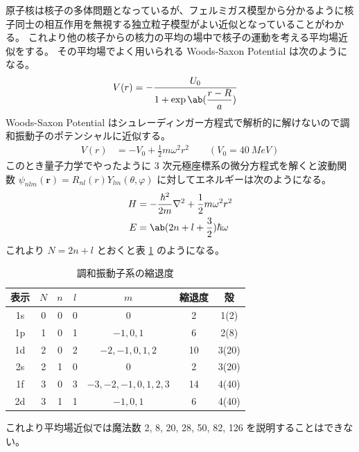 \documentclass[uplatex,dvipdfmx,a4paper,11pt]{jlreq}
\newcommand{\rr}{\bm{r}}
\numberwithin{equation}{section}
\theoremstyle{definition}
\begin{document}
原子核は核子の多体問題となっているが、フェルミガス模型から分かるように核子同士の相互作用を無視する独立粒子模型がよい近似となっていることがわかる。
これより他の核子からの核力の平均の場中で核子の運動を考える平均場近似をする。
その平均場でよく用いられる Woods-Saxon Potential は次のようになる。
\begin{align}
  V(r) & = -\frac{U_0}{1 + \exp\ab(\dfrac{r - R}{a})}
\end{align}
Woods-Saxon Potential はシュレーディンガー方程式で解析的に解けないので調和振動子のポテンシャルに近似する。
\begin{align}
  V(r) & = -V_0 + \frac{1}{2}m\omega^2r^2 \qquad (V_0 = 40\ \si{MeV})
\end{align}
このとき量子力学でやったように 3 次元極座標系の微分方程式を解くと波動関数 $\psi_{nlm}(\rr) = R_{nl}(r)Y_{lm}(\theta, \varphi)$ に対してエネルギーは次のようになる。
\begin{align}
  H & = -\frac{\hbar^2}{2m}\nabla^2 + \frac{1}{2}m\omega^2r^2 \\
  E & = \ab(2n + l + \frac{3}{2})\hbar\omega
\end{align}
これより $N = 2n + l$ とおくと表 \ref{table:oscillator} のようになる。
\begin{table}[hbtp]
  \centering
  \begin{tabular}{|c|c|c|c|c|c|c|}
    \hline
    表示 & $N$ & $n$ & $l$ & $m$                & 縮退度 & 殻     \\
    \hline \hline
    1s & 0   & 0   & 0   & 0                  & 2   & 1(2)  \\
    1p & 1   & 0   & 1   & $-1,0,1$           & 6   & 2(8)  \\
    1d & 2   & 0   & 2   & $-2,-1,0,1,2$      & 10  & 3(20) \\
    2s & 2   & 1   & 0   & 0                  & 2   & 3(20) \\
    1f & 3   & 0   & 3   & $-3,-2,-1,0,1,2,3$ & 14  & 4(40) \\
    2d & 3   & 1   & 1   & $-1,0,1$           & 6   & 4(40) \\
    \hline
  \end{tabular}
  \caption{調和振動子系の縮退度}
  \label{table:oscillator}
\end{table}
これより平均場近似では魔法数 2, 8, 20, 28, 50, 82, 126 を説明することはできない。
\end{document}
